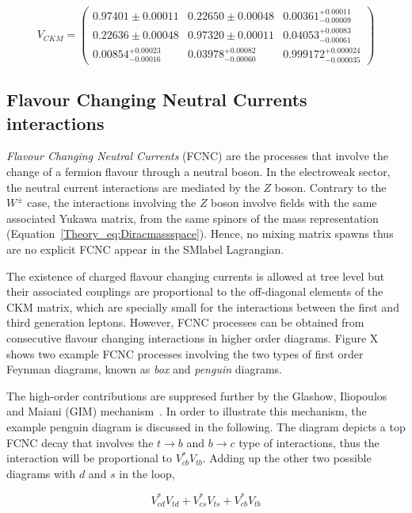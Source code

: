 \begin{equation}
        V_{CKM}= \begin{pmatrix} 0.97401 \pm 0.00011 & 0.22650 \pm 0.00048 & 0.00361^{+0.00011}_{-0.00009} \\ 0.22636 \pm 0.00048 & 0.97320 \pm 0.00011 & 0.04053^{+0.00083}_{-0.00061} \\ 0.00854^{+0.00023}_{-0.00016} & 0.03978^{+0.00082}_{-0.00060} & 0.999172^{+0.000024}_{-0.000035} \end{pmatrix}
\end{equation}

\subsection{Flavour Changing Neutral Currents interactions}
\label{Theory_SMsubsec:FCNC}
\textit{Flavour Changing Neutral Currents} (FCNC) are the processes that involve the change of a fermion flavour through a neutral boson. In the electroweak sector, the neutral current interactions are mediated by the $Z$ boson. Contrary to the $W^\pm$ case, the interactions involving the $Z$ boson involve fields with the same associated Yukawa matrix, from the same spinors of the mass representation (Equation~\ref{Theory_eq:Diracmassspace}). Hence, no mixing matrix spawns thus are no explicit FCNC appear in the \acrshort{SMlabel} Lagrangian.

The existence of charged flavour changing currents is allowed at tree level but their associated couplings are proportional to the off-diagonal elements of the CKM matrix, which are specially small for the interactions between the first and third generation leptons. However, FCNC processes can be obtained from consecutive flavour changing interactions in higher order diagrams. Figure X shows two example FCNC processes involving the two types of first order Feynman diagrams, known as \textit{box} and \textit{penguin} diagrams.

The high-order contributions are suppresed further by the Glashow, Iliopoulos and Maiani (GIM) mechanism~\cite{PhysRevD.2.1285}. In order to illustrate this mechanism, the example penguin diagram is discussed in the following. The diagram depicts a top FCNC decay that involves the $t\to b$ and $b\to c$ type of interactions, thus the interaction will be proportional to $V_{cb}^*V_{tb}$. Adding up the other two possible diagrams with $d$ and $s$ in the loop, 

\begin{equation}
    V_{cd}^*V_{td}+V_{cs}^*V_{ts}+V_{cb}^*V_{tb}
\end{equation}

